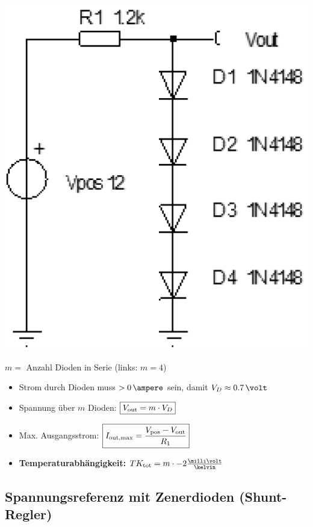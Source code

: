 \begin{minipage}[c]{0.25\columnwidth}
    \includegraphics[width=\columnwidth]{images/spannungsreferenz_4_dioden.png}
\end{minipage}
\hfill
\begin{minipage}[c]{0.73\columnwidth}
    $m = $ Anzahl Dioden in Serie (links: $m = 4$) 

    \begin{itemize}
        \item Strom durch Dioden muss $> 0 \, \ampere$ sein, damit $V_D \approx 0.7 \, \volt$
        \item Spannung über $m$ Dioden: $ \boxed{ V_{\rm out} = m \cdot V_D }$
        \item Max. Ausgangsstrom: $ \boxed{I_{\rm out, max} =  \frac{V_{\rm pos} - V_{\rm out}}{R_1}} $
        \item \textbf{Temperaturabhängigkeit:} $TK_{\rm tot} = m \cdot -2 \frac{\milli \volt}{\kelvin}$
    \end{itemize}

\end{minipage}


\subsection{Spannungsreferenz mit Zenerdioden (Shunt-Regler)}

